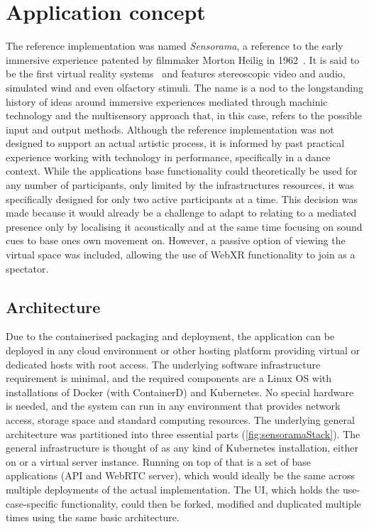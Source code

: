 \chapter{Application concept}
\label{ch:concept}

The reference implementation was named \emph{Sensorama}, a reference to the early immersive experience patented by filmmaker Morton Heilig in 1962~\parencite{Heilig_1962}.
It is said to be the first virtual reality systems~\parencite[5][]{vrHistoryGigante} and features stereoscopic video and audio, simulated wind and even olfactory stimuli.
The name is a nod to the longstanding history of ideas around immersive experiences mediated through machinic technology and the multisensory approach that, in this case, refers to the possible input and output methods.
Although the reference implementation was not designed to support an actual artistic process, it is informed by past practical experience working with technology in performance, specifically in a dance context.
While the application\textquotesingle s base functionality could theoretically be used for any number of participants, only limited by the infrastructure\textquotesingle s resources, it was specifically designed for only two active participants at a time.
This decision was made because it would already be a challenge to adapt to relating to a mediated presence only by localising it acoustically and at the same time focusing on sound cues to base one\textquotesingle s own movement on.
However, a passive option of viewing the virtual space was included, allowing the use of \ac{WebXR} functionality to join as a spectator.

\section{Architecture}
\label{sec:architecture}

Due to the containerised packaging and deployment, the application can be deployed in any cloud environment or other hosting platform providing virtual or dedicated hosts with root access.
The underlying software infrastructure requirement is minimal, and the required components are a Linux \ac{OS} with installations of Docker (with ContainerD) and Kubernetes.
No special hardware is needed, and the system can run in any environment that provides network access, storage space and standard computing resources.
The underlying general architecture was partitioned into three essential parts (\autoref{fig:sensoramaStack}).
The general infrastructure is thought of as any kind of Kubernetes installation, either on  or a virtual server instance.
Running on top of that is a set of base applications (\ac{API} and \ac{WebRTC} server), which would ideally be the same across multiple deployments of the actual implementation.
The \ac{UI}, which holds the use-case-specific functionality, could then be forked, modified and duplicated multiple times using the same basic architecture.

